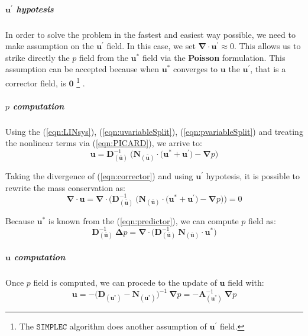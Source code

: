 \subparagraph{$\boldsymbol{u}^{\prime}$ hypotesis}
In order to solve the problem in the fastest and easiest way possible, we need to make assumption on the $\boldsymbol{u}^{\prime}$ field. In this case, we set $\boldsymbol{\nabla} \cdot \boldsymbol{u}^{\prime} \approx  0$. This allows us to strike directly the $p$ field from the $\boldsymbol{u}^*$ field via the \textbf{Poisson} formulation. This assumption can be accepted because when $\boldsymbol{u}^*$ converges to $\boldsymbol{u}$ the $\boldsymbol{u}^{\prime}$, that is a corrector field, is $\boldsymbol{0}$ \footnote{The $\mathtt{SIMPLEC}$ algorithm does another assumption of $\boldsymbol{u}^{\prime}$ field. } .  

\subparagraph{$p$ computation}
Using the (\ref{eqn:LINsys}), (\ref{eqn:uvariableSplit}), (\ref{eqn:pvariableSplit}) and treating the nonlinear terms via (\ref{eqn:PICARD}), we arrive to:
\begin{equation}
    \boldsymbol{u} = \boldsymbol{D}^{-1}_{(\bar{\boldsymbol{u}})} \ \big( \boldsymbol{N}_{(\bar{\boldsymbol{u}})} \cdot \big( \boldsymbol{u}^* + \boldsymbol{u}^{\prime} \big) - \boldsymbol{\nabla} p \big)
    \label{eqn:corrector}
\end{equation}

\noindent Taking the divergence of (\ref{eqn:corrector}) and using $\boldsymbol{u}^{\prime}$ hypotesis, it is possible to rewrite the mass conservation as:
\begin{equation}
    \boldsymbol{\nabla} \cdot \boldsymbol{u} = \boldsymbol{\nabla} \cdot \big( \boldsymbol{D}^{-1}_{(\bar{\boldsymbol{u}})} \ \big( \boldsymbol{N}_{(\bar{\boldsymbol{u}})} \cdot \big( \boldsymbol{u}^* + \boldsymbol{u}^{\prime} \big) - \boldsymbol{\nabla} p \big) \big) = 0
    \label{eqn:pstepDiv}
\end{equation}

\noindent Because $\boldsymbol{u}^*$ is known from the (\ref{eqn:predictor}), we can compute $p$ field as:
\begin{equation}
    \boldsymbol{D}^{-1}_{(\bar{\boldsymbol{u}})} \ \boldsymbol{\Delta} p = \boldsymbol{\nabla} \cdot \big( \boldsymbol{D}^{-1}_{(\bar{\boldsymbol{u}})} \ \boldsymbol{N}_{(\bar{\boldsymbol{u}})} \cdot \boldsymbol{u}^* \big)  
    \label{eqn:pComp}
\end{equation}

\subparagraph{$\boldsymbol{u}$ computation} Once $p$ field is computed, we can procede to the update of $\boldsymbol{u}$ field with:
\begin{equation}
    \boldsymbol{u} = - \big( \boldsymbol{D}_{(\boldsymbol{u}^*)} - \boldsymbol{N}_{(\boldsymbol{u}^*)} \big)^{-1} \ \boldsymbol{\nabla} p = - \boldsymbol{A}_{(\boldsymbol{u}^*)}^{-1} \ \boldsymbol{\nabla} p
    \label{eqn:u_comp} 
\end{equation}

